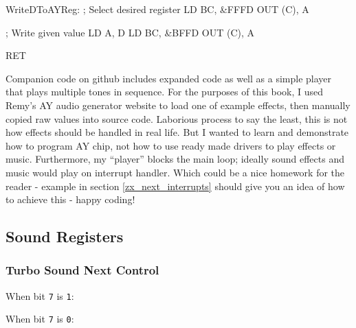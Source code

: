 \begin{tcblisting}{}
WriteDToAYReg:
	; Select desired register
	LD BC, &FFFD
	OUT (C), A
	
	; Write given value
	LD A, D
	LD BC, &BFFD
	OUT (C), A
	
	RET
\end{tcblisting}

Companion code on github includes expanded code as well as a simple player that plays multiple tones in sequence. For the purposes of this book, I used Remy's AY audio generator website to load one of example effects, then manually copied raw values into source code. Laborious process to say the least, this is not how effects should be handled in real life. But I wanted to learn and demonstrate how to program AY chip, not how to use ready made drivers to play effects or music. Furthermore, my ``player'' blocks the main loop; ideally sound effects and music would play on interrupt handler. Which could be a nice homework for the reader - example in section \ref{zx_next_interrupts} should give you an idea of how to achieve this - happy coding!


\pagebreak
\subsection{Sound Registers}

\subsubsection{Turbo Sound Next Control }

When bit {\tt 7} is {\tt 1}:

\begin{NextPort}
\end{NextPort}

When bit {\tt 7} is {\tt 0}:

\begin{NextPort}
\end{NextPort}


